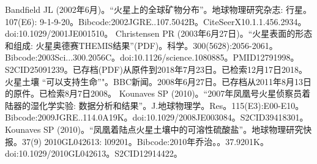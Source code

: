 \begin{enumerate}
 Bandfield JL (2002年6月)。“火星上的全球矿物分布”。地球物理研究杂志: 行星。107(E6): 9-1-9-20。Bibcode:2002JGRE..107.5042B。CiteSeerX10.1.1.456.2934。doi:10.1029/2001JE001510。 
 Christensen PR (2003年6月27日)。“火星表面的形态和组成: 火星奥德赛THEMIS结果”(PDF)。科学。300(5628):2056-2061。Bibcode:2003Sci...300.2056C。doi:10.1126/science.1080885。PMID12791998。S2CID25091239。已存档(PDF)从原件到2018年7月23日。已检索12月17日2018。   
 火星土壤 “可以支持生命”"。BBC新闻。2008年6月27日。已存档从2011年8月13日的原件。已检索8月7日2008。
 Kounaves SP (2010)。“2007年凤凰号火星侦察员着陆器的湿化学实验: 数据分析和结果”。J.地球物理学。Res。115(E3):E00-E10。Bibcode:2009JGRE..114.0A19K。doi:10.1029/2008JE003084。S2CID39418301。  
 Kounaves SP (2010)。“凤凰着陆点火星土壤中的可溶性硫酸盐”。地球物理研究快报。37(9) 2010GL042613: l09201。Bibcode:2010年乔治。。37.9201K。doi:10.1029/2010GL042613。S2CID12914422。 




\end{enumerate}